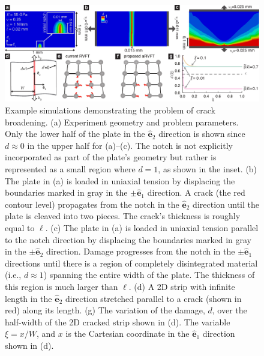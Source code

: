 \documentclass[10pt,letterpaper]{article}
\begin{document}
    \begin{figure}[h!]
      \centering
        \includegraphics[width=\textwidth]{Figures/Broadening/Broadening_V9.pdf}
          \caption{ \footnotesize Example simulations demonstrating the problem of crack broadening. (a) Experiment geometry and problem parameters. Only the lower half of the plate in the $\hat{\mathbf{e}}_2$ direction is shown since $d\approx 0$ in the upper half for (a)--(c). The notch is not explicitly incorporated as part of the plate's geometry but rather is represented as a small region where $d=1$, as shown in the inset. (b) The plate in (a) is loaded in uniaxial tension by displacing the boundaries marked in gray in the $\pm \hat{\mathbf{e}}_1$ direction. A crack (the red contour level) propagates from the notch in the $\hat{\mathbf{e}}_2$ direction until the plate is cleaved into two pieces. The crack's thickness is roughly equal to $\ell$. (c) The plate in (a) is loaded in uniaxial tension parallel to the notch direction by displacing the boundaries marked in gray in the $\pm \hat{\mathbf{e}}_2$ direction. Damage progresses from the notch in the $\pm \hat{\mathbf{e}}_1$ directions until there is a region of completely disintegrated material (i.e., $d\approx1$) spanning the entire width of the plate. The thickness of this region is much larger than $\ell$. (d) A 2D strip with infinite length in the $\hat{\mathbf{e}}_2$ direction stretched parallel to a crack (shown in red) along its length. (g) The variation of the damage, $d$, over the half-width of the 2D cracked strip shown in (d). The variable $\xi=x/W$, and $x$ is the Cartesian coordinate in the  $\hat{\mathbf{e}}_1$ direction shown in (d).
      }
      \label{f:broadening}
    \end{figure}
%
\end{document}
